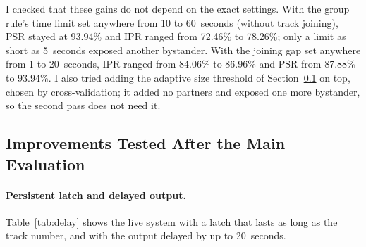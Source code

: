 \begin{table}[htbp]
\begin{singlespace}
\centering
\caption{Effect of the offline second pass on Set~C (102 clips, 95\% Wilson intervals).
Each column adds one rule to the previous one.}
\label{tab:secondpass}
\renewcommand{\arraystretch}{1.3}
\end{singlespace}
\end{table}

I checked that these gains do not depend on the exact settings. With the group rule's time
limit set anywhere from 10 to 60~seconds (without track joining), PSR stayed at 93.94\% and
IPR ranged from 72.46\% to 78.26\%; only a limit as short as 5~seconds exposed another
bystander. With the joining gap set anywhere from 1 to 20~seconds, IPR ranged from 84.06\%
to 86.96\% and PSR from 87.88\% to 93.94\%. I also tried adding the adaptive size threshold
of Section~\ref{sec:res_improve} on top, chosen by cross-validation; it added no partners
and exposed one more bystander, so the second pass does not need it.

\subsection{Improvements Tested After the Main Evaluation}
\label{sec:res_improve}

\paragraph{Persistent latch and delayed output.}
Table~\ref{tab:delay} shows the live system with a latch that lasts as long as the track
number, and with the output delayed by up to 20~seconds.

